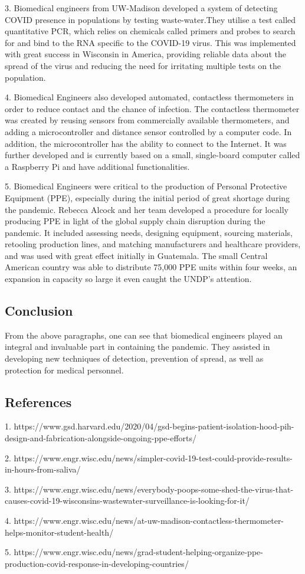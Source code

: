 \documentclass[11pt]{article}
\begin{document}
3. Biomedical engineers from UW-Madison developed a system of detecting COVID presence in populations by testing waste-water.They utilise a test called quantitative PCR, which relies on chemicals called primers and probes to search for and bind to the RNA specific to the COVID-19 virus. This was implemented with great success in Wisconsin in America, providing reliable data about the spread of the virus and reducing the need for irritating multiple tests on the population.

4. Biomedical Engineers also developed automated, contactless thermometers in order to reduce contact and the chance of infection. The contactless thermometer was created by reusing sensors from commercially available thermometers, and adding a microcontroller and distance sensor controlled by a computer code. In addition, the microcontroller has the ability to connect to the Internet. It was further developed and is currently based on a small, single-board computer called a Raspberry Pi and have additional functionalities.

5. Biomedical Engineers were critical to the production of Personal Protective Equipment (PPE), especially during the initial period of great shortage during the pandemic. Rebecca Alcock and her team developed a procedure for locally producing PPE in light of the global supply chain disruption during the pandemic. It included assessing needs, designing equipment, sourcing materials, retooling production lines, and matching manufacturers and healthcare providers, and was used with great effect initially in Guatemala. The small Central American country was able to distribute 75,000 PPE units within four weeks, an expansion in capacity so large it even caught the UNDP's attention.

\subsection*{Conclusion}

From the above paragraphs, one can see that biomedical engineers played an integral and invaluable part in containing the pandemic. They assisted in developing new techniques of detection, prevention of spread, as well as protection for medical personnel.  


\subsection{References}

1. https://www.gsd.harvard.edu/2020/04/gsd-begins-patient-isolation-hood-pih-design-and-fabrication-alongside-ongoing-ppe-efforts/

2. https://www.engr.wisc.edu/news/simpler-covid-19-test-could-provide-results-in-hours-from-saliva/

3. https://www.engr.wisc.edu/news/everybody-poops-some-shed-the-virus-that-causes-covid-19-wisconsins-wastewater-surveillance-is-looking-for-it/

4. https://www.engr.wisc.edu/news/at-uw-madison-contactless-thermometer-helps-monitor-student-health/

5. https://www.engr.wisc.edu/news/grad-student-helping-organize-ppe-production-covid-response-in-developing-countries/
\end{document}
